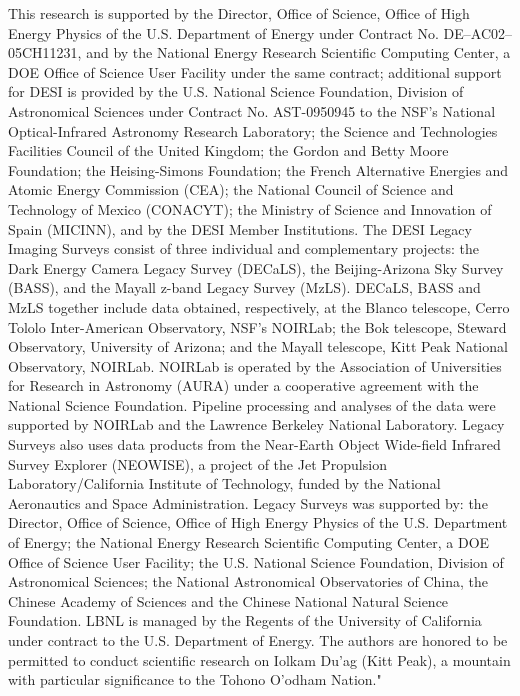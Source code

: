 This research is supported by the Director, Office of Science, Office of High Energy Physics of the U.S. Department of Energy under Contract No. DE–AC02–05CH11231, and by the National Energy Research Scientific Computing Center, a DOE Office of Science User Facility under the same contract; additional support for DESI is provided by the U.S. National Science Foundation, Division of Astronomical Sciences under Contract No. AST-0950945 to the NSF’s National Optical-Infrared Astronomy Research Laboratory; the Science and Technologies Facilities Council of the United Kingdom; the Gordon and Betty Moore Foundation; the Heising-Simons Foundation; the French Alternative Energies and Atomic Energy Commission (CEA); the National Council of Science and Technology of Mexico (CONACYT); the Ministry of Science and Innovation of Spain (MICINN), and by the DESI Member Institutions. The DESI Legacy Imaging Surveys consist of three individual and complementary projects: the Dark Energy Camera Legacy Survey (DECaLS), the Beijing-Arizona Sky Survey (BASS), and the Mayall z-band Legacy Survey (MzLS). DECaLS, BASS and MzLS together include data obtained, respectively, at the Blanco telescope, Cerro Tololo Inter-American Observatory, NSF’s NOIRLab; the Bok telescope, Steward Observatory, University of Arizona; and the Mayall telescope, Kitt Peak National Observatory, NOIRLab. NOIRLab is operated by the Association of Universities for Research in Astronomy (AURA) under a cooperative agreement with the National Science Foundation. Pipeline processing and analyses of the data were supported by NOIRLab and the Lawrence Berkeley National Laboratory. Legacy Surveys also uses data products from the Near-Earth Object Wide-field Infrared Survey Explorer (NEOWISE), a project of the Jet Propulsion Laboratory/California Institute of Technology, funded by the National Aeronautics and Space Administration. Legacy Surveys was supported by: the Director, Office of Science, Office of High Energy Physics of the U.S. Department of Energy; the National Energy Research Scientific Computing Center, a DOE Office of Science User Facility; the U.S. National Science Foundation, Division of Astronomical Sciences; the National Astronomical Observatories of China, the Chinese Academy of Sciences and the Chinese National Natural Science Foundation. LBNL is managed by the Regents of the University of California under contract to the U.S. Department of Energy. The authors are honored to be permitted to conduct scientific research on Iolkam Du’ag (Kitt Peak), a mountain with particular significance to the Tohono O’odham Nation."